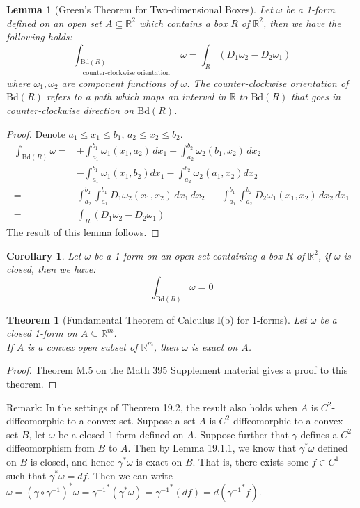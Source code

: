 \documentclass[15pt]{book}
\theoremstyle{break}
\theoremstyle{break}
\newtheorem{thm}{Theorem}[section]
\newtheorem{lem}{Lemma}[thm]
\newtheorem{corL}{Corollary}[lem]
\newcommand{\R}{\mathbb{R}}
\newcommand{\Bd}{\text{Bd}}
\newcommand{\remark}{\color{blue}Remark: \color{black}}
\begin{document}
\begin{lem}[Green's Theorem for Two-dimensional Boxes]
Let $\omega$ be a 1-form defined on an open set $A\subseteq \R^2$ which contains a box $R$ of $\R^2$, then we have the following holds: 
$$\int_{\substack{{\Bd(R)}\\ \text{ counter-clockwise orientation}}} \omega = \int_R (D_1\omega_2 - D_2\omega_1)$$ 
where $\omega_1,\omega_2$ are component functions of $\omega$. The counter-clockwise orientation of $\Bd(R)$ refers to a path which maps an interval in $\R$ to $\Bd(R)$ that goes in counter-clockwise direction on $\Bd(R)$.
\end{lem}
\begin{proof}
Denote $a_1\leq x_1\leq b_1$, $a_2\leq x_2\leq b_2$. 
\begin{align*}
\int_{\Bd(R)}\omega =&+ \int_{a_1}^{b_1}\omega_1(x_1,a_2)\, dx_1+\int_{a_2}^{b_2}\omega_2(b_1,x_2)\, dx_2 \\
&-\int_{a_1}^{b_1} \omega_1 (x_1,b_2)dx_1 - \int_{a_2}^{b_2} \omega_2(a_1,x_2)dx_2\\
=& \int_{a_2}^{b_2}\int_{a_1}^{b_1} D_1\omega_2(x_1,x_2)\,dx_1\, dx_2 \ -\  \int_{a_1}^{b_1}\int_{a_2}^{b_2} D_2\omega_1(x_1,x_2)\,dx_2\,dx_1\\
=& \int_R (D_1\omega_2 - D_2\omega_1)
\end{align*}
The result of this lemma follows.
\end{proof}

\begin{corL}
Let $\omega$ be a 1-form on an open set containing a box $R$ of $\R^2$, if $\omega$ is closed, then we have: 
$$\int_{\Bd(R)}\omega = 0$$
\end{corL}


\begin{thm}[Fundamental Theorem of Calculus I(b) for 1-forms]
Let $\omega$ be a closed 1-form on $A\subseteq \R^m$. \\
If $A$ is a convex open subset of $\R^m$, then  $\omega$ is exact on $A$.  
\end{thm}
\begin{proof}
Theorem M.5 on the Math 395 Supplement material gives a proof to this theorem.
\end{proof}

\remark In the settings of Theorem 19.2, the result also holds when $A$ is $C^2$-diffeomorphic to a convex set. Suppose a set $A$ is $C^2$-diffeomorphic to a convex set $B$, let $\omega$ be a closed $1$-form defined on $A$. Suppose further that $\gamma$ defines a $C^2$-diffeomorphism from $B$ to $A$. Then by Lemma 19.1.1, we know that $\gamma^*\omega$ defined on $B$ is closed, and hence $\gamma^*\omega$ is exact on $B$. That is, there exists some $f \in C^1$ such that $\gamma^*\omega  = df$. Then we can write $\omega = (\gamma\circ \gamma^{-1})^*\omega  = {\gamma^{-1}}^*(\gamma^*\omega) = {\gamma^{-1}}^*(df) = d({\gamma^{-1}}^*f)$.\\
\end{document}
